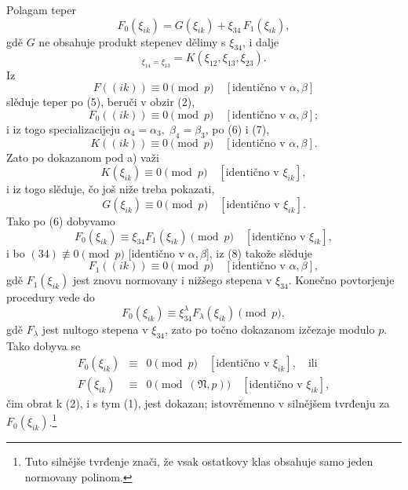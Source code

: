 \documentclass[11pt]{article}
\providecommand{\frN}{\mathfrak N}
\begin{document}
Polagam teper
\begin{equation}
        F_0(\xi_{ik})=G(\xi_{ik})+\xi_{34}\,F_1(\xi_{ik}),
\end{equation}
gdě \(G\) ne obsahuje produkt stepenev dělimy s \(\xi_{34}\), i dalje
\begin{equation}
        [G]_{\xi_{14}=\xi_{13}}=K(\xi_{12},\xi_{13},\xi_{23}).
\end{equation}
Iz
\[
        F((ik))\equiv0\pmod p\quad[\text{identično v \(\alpha,\beta\)}]
\]
slěduje teper po (5), beruči v obzir (2),
\begin{equation}
        F_0((ik))\equiv0\pmod p\quad [\text{identično v \(\alpha,\beta\)}];
\end{equation}
i iz togo specializacijeju \(\alpha_4=\alpha_3,\;\beta_4=\beta_3\), po (6) i (7),
\[
        K((ik))\equiv0\pmod p\quad [\text{identično v \(\alpha,\beta\)}].
\]
Zato po dokazanom pod a) važi
\[
        K(\xi_{ik})\equiv0\pmod p\quad [\text{identično v \(\xi_{ik}\)}],
\]
i iz togo slěduje, čo još niže treba pokazati,
\[
        G(\xi_{ik})\equiv0\pmod p\quad [\text{identično v \(\xi_{ik}\)}].
\]
Tako po (6) dobyvamo
\[
        F_0(\xi_{ik})\equiv\xi_{34}F_1(\xi_{ik})\pmod p\quad [\text{identično v \(\xi_{ik}\)}],
\]
i bo \((34)\not\equiv0\pmod p\) [identično v \(\alpha,\beta\)], iz (8) takože slěduje
\[
        F_1((ik))\equiv0\pmod p\quad [\text{identično v \(\alpha,\beta\)}],
\]
gdě \(F_1(\xi_{ik})\) jest znovu normovany i nižšego stepena v \(\xi_{34}\). Konečno povtorjenje procedury vede do
\[
        F_0(\xi_{ik})\equiv\xi_{34}^{\lambda}F_\lambda(\xi_{ik})\pmod p,
\]
gdě \(F_\lambda\) jest nultogo stepena v \(\xi_{34}\), zato po točno dokazanom izčezaje modulo \(p\). Tako dobyva se
\begin{equation}
\begin{array}{rcl}
        F_0(\xi_{ik})&\equiv&0\pmod p\quad [\text{identično v \(\xi_{ik}\)}],\quad\text{ili}\\
        F(\xi_{ik})&\equiv&0\pmod{(\frN,p)}\quad [\text{identično v \(\xi_{ik}\)}],
\end{array}
\end{equation}
čim obrat k (2), i s tym (1), jest dokazan; istovrěmenno v silnějšem tvrđenju za \(F_0(\xi_{ik})\).\footnote{Tuto silnějše tvrđenje znači, že vsak ostatkovy klas obsahuje samo jeden normovany polinom.}
\end{document}
